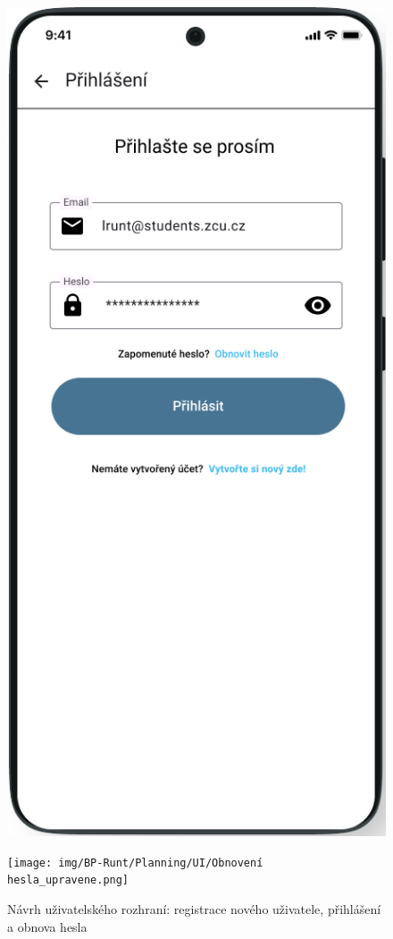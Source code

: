 \documentclass[czech, bc, kiv, he, iso690numb]{fasthesis}
\begin{document}
\begin{figure}[h!]
\begin{minipage}[h]{0.30\textwidth}
  \end{minipage}
  \hfill
  \begin{minipage}[h]{0.30\textwidth}
    \includegraphics[width=\textwidth]{img/BP-Runt/Planning/UI/Přihlášení_edited.png}
  \end{minipage}
  \hfill
  \begin{minipage}[h]{0.30\textwidth}
    \texttt{[image: img/BP-Runt/Planning/UI/Obnovení hesla\_upravene.png]}
  \end{minipage}
  \caption{Návrh uživatelského rozhraní: registrace nového uživatele, přihlášení a obnova hesla}
  \label{fig:planning_UI_3}
\end{figure}
\end{document}
